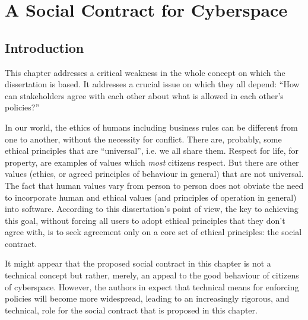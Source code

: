 \chapter{A Social Contract for Cyberspace}

\section{Introduction}
This chapter addresses a critical
weakness in the whole concept on which the dissertation is based. It
addresses a crucial issue on which they all depend: ``How can stakeholders
agree with each other about what is allowed in each other's policies?''

In our world, the ethics of humans including business rules can be different from one to another,
without the necessity for conflict. There are, probably, some ethical
principles that are ``universal'', i.e. we all share them. Respect for life, for property, are examples of values which {\em most} citizens respect. But there are other values (ethics, or agreed principles of behaviour in general) 
that are not universal. The fact that human values vary from person to person does not obviate
the need to incorporate human and ethical values (and principles
of operation in general) into software. According to this dissertation's point of view, the
key to achieving this goal, without forcing all users to adopt ethical
principles that they don't agree with, is to seek agreement only on a
core set of ethical principles: the social contract.

It might appear that the proposed social contract in this chapter is not a
technical concept but rather, merely, an appeal to the good behaviour of
citizens of cyberspace. However, the authors in \cite{sheniar2021social}
expect that technical means for enforcing policies will become more
widespread, leading to \iffalse an increasingly rigorous, and technical, role
for the social contract\fi an increasingly rigorous, and technical, role for the social contract that is proposed in this chapter. 






